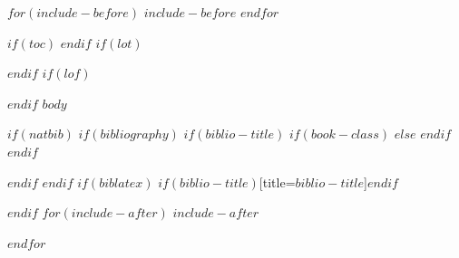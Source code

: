 \documentclass[$if(fontsize)$$fontsize$,$endif$$if(lang)$$lang$,$endif$$if(papersize)$$papersize$,$endif$$for(classoption)$$classoption$$sep$,$endfor$]{$documentclass$}
\begin{document}
$for(include-before)$
$include-before$
$endfor$

$if(toc)$
{
\hypersetup{linkcolor=$if(toccolor)$$toccolor$$else$black$endif$}
\setcounter{tocdepth}{$toc-depth$}
\tableofcontents
}
$endif$
$if(lot)$
\listoftables
$endif$
$if(lof)$
\listoffigures
$endif$
$body$

$if(natbib)$
$if(bibliography)$
$if(biblio-title)$
$if(book-class)$
\renewcommand\bibname{$biblio-title$}
$else$
\renewcommand\refname{$biblio-title$}
$endif$
$endif$


$endif$
$endif$
$if(biblatex)$
\printbibliography$if(biblio-title)$[title=$biblio-title$]$endif$

$endif$
$for(include-after)$
$include-after$

$endfor$
\end{document}
